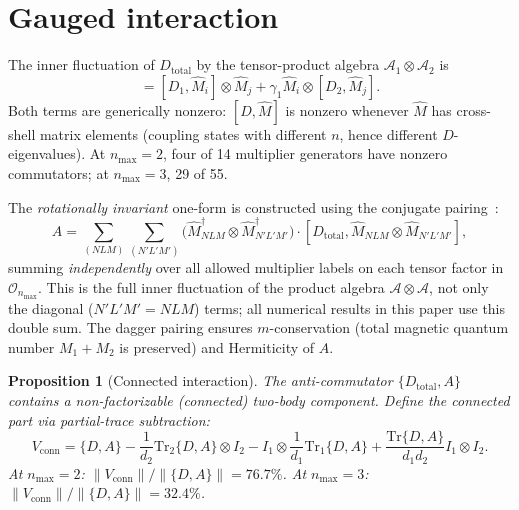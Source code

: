 \documentclass[twocolumn,pra,amsmath,amssymb,superscriptaddress]{revtex4-2}
\newtheorem{proposition}[theorem]{Proposition}
\begin{document}
\section{Gauged interaction}
\label{sec:gauged}

The inner fluctuation of $D_{\mathrm{total}}$ by the tensor-product
algebra $\mathcal{A}_1 \otimes \mathcal{A}_2$ is
\begin{equation}
  [D_{\mathrm{total}}, \hat{M}_i \otimes \hat{M}_j] =
  [D_1, \hat{M}_i] \otimes \hat{M}_j
  + \gamma_1 \hat{M}_i \otimes [D_2, \hat{M}_j].
  \label{eq:fluctuation}
\end{equation}
Both terms are generically nonzero: $[D, \hat{M}]$ is nonzero
whenever $\hat{M}$ has cross-shell matrix elements (coupling states
with different $n$, hence different $D$-eigenvalues). At $n_{\max} =
2$, four of 14 multiplier generators have nonzero commutators; at
$n_{\max} = 3$, 29 of 55.

The \emph{rotationally invariant} one-form is constructed using the
conjugate pairing~\cite{connes_book1994}:
\begin{equation}
  A = \sum_{(NLM)} \sum_{(N'L'M')}
  \bigl(\hat{M}_{NLM}^\dagger \otimes \hat{M}_{N'L'M'}^\dagger\bigr)
  \cdot [D_{\mathrm{total}}, \hat{M}_{NLM} \otimes \hat{M}_{N'L'M'}],
  \label{eq:A_full}
\end{equation}
summing \emph{independently} over all allowed multiplier labels on each
tensor factor in $\mathcal{O}_{n_{\max}}$. This is the full inner
fluctuation of the product algebra $\mathcal{A} \otimes \mathcal{A}$,
not only the diagonal ($N'L'M' = NLM$) terms; all numerical results in
this paper use this double sum. The dagger pairing ensures
$m$-conservation (total magnetic quantum number $M_1 + M_2$ is
preserved) and Hermiticity of $A$.

\begin{proposition}[Connected interaction]
\label{prop:connected}
The anti-commutator $\{D_{\mathrm{total}}, A\}$ contains a
non-factorizable (connected) two-body component. Define the connected
part via partial-trace subtraction:
\[
V_{\mathrm{conn}} = \{D,A\} - \frac{1}{d_2}\mathrm{Tr}_2\{D,A\}
\otimes I_2 - I_1 \otimes \frac{1}{d_1}\mathrm{Tr}_1\{D,A\}
+ \frac{\mathrm{Tr}\{D,A\}}{d_1 d_2} I_1 \otimes I_2.
\]
At $n_{\max} = 2$: $\|V_{\mathrm{conn}}\| / \|\{D,A\}\| = 76.7\%$.
At $n_{\max} = 3$: $\|V_{\mathrm{conn}}\| / \|\{D,A\}\| = 32.4\%$.
\end{proposition}
\end{document}
